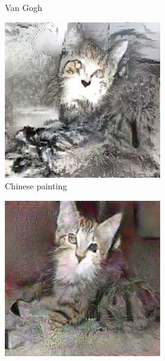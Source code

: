 \documentclass[10pt,twocolumn,letterpaper]{article}
\begin{document}
\begin{figure}
\begin{subfigure}[b]{0.18\textwidth}
    \caption{Van Gogh}
    \label{fig::base34}
  \end{subfigure}
  \begin{subfigure}[b]{0.18\textwidth}
    \includegraphics[width=\textwidth]{figure/baseline3/chinese.jpg}
    \caption{Chinese painting}
    \label{fig::base35}
  \end{subfigure}
  \caption{Baseline 3: Smoothing, Canny, DIS, and feeding AWAST with the detailed image}
  \label{fig::cannyplus}
  \begin{subfigure}[b]{0.18\textwidth}
    \includegraphics[width=\textwidth]{figure/baseline1/pix2pix.jpg}

\end{subfigure}
\end{figure}
\end{document}

